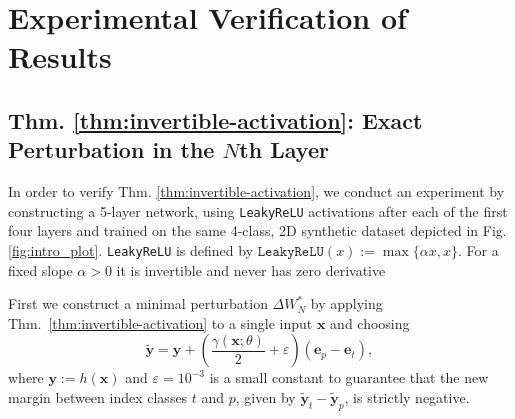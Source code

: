 \documentclass{article}
\theoremstyle{plain}
\theoremstyle{definition}
\theoremstyle{remark}
\begin{document}
\section{Experimental Verification of Results}


\subsection{Thm. \ref{thm:invertible-activation}: Exact Perturbation in the $N$th Layer}

In order to verify Thm. \ref{thm:invertible-activation}, we conduct an experiment by constructing a 5-layer network, using \texttt{LeakyReLU} activations after each of the first four layers and trained on the same 4-class, 2D synthetic dataset depicted in Fig. \ref{fig:intro_plot}. \texttt{LeakyReLU}  is defined by \(\mathrm{\texttt{LeakyReLU} }(x) := \max\{\alpha x, x\}\). For a fixed slope \(\alpha > 0\) it is invertible and never has zero derivative 

First we construct a minimal perturbation $\Delta W_N^\ast$ by applying Thm.~\ref{thm:invertible-activation} to a single input $\mathbf x$  and choosing
\[
\tilde{\textbf{y}} = \textbf{y} + \left(\frac{\gamma(\mathbf x;\theta)}{2}+\varepsilon\right)(\mathbf{e}_p-\mathbf{e}_t),
\]
where  $\mathbf y := h(\mathbf x)$ and \(\varepsilon=10^{-3}\) is a small constant to guarantee that the new margin between index classes $t$ and $p$, given by $\tilde{\mathbf y}_t-\tilde{\mathbf y}_p$, is strictly negative.

\end{document}
